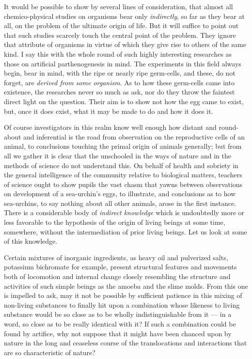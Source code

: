 \documentclass[a4paper, 11pt, oneside, polutonikogreek, english]{article}
\begin{document}
It would be possible to show by several lines of consideration, that almost all chemico-physical studies on organisms bear only \emph{indirectly}, so far as they bear at all, on the problem of the ultimate origin of life. But it will suffice to point out that such studies scarcely touch the central point of the problem. They ignore that attribute of organisms in virtue of which they give rise to others of the same kind. I say this with the whole round of such highly interesting researches as those on artificial parthenogenesis in mind. The experiments in this field always begin, bear in mind, with the ripe or nearly ripe germ-cells, and these, do not forget, are \emph{derived from some organism}. As to how these germ-cells came into existence, the researches never so much as ask, nor do they throw the faintest direct light on the question. Their aim is to show not how the egg came to exist, but, once it does exist, what it may be made to do and how it does it.

Of course investigators in this realm know well enough how distant and round-about and inferential is the road from observation on the reproductive cells of an animal, to conclusions touching the primal origin of animals generally; but from all we gather it is clear that the unschooled in the ways of nature and in the methods of science do not understand this. On behalf of health and sobriety in the general intelligence of the community relative to biological matters, teachers of science ought to show pupils the vast chasm that yawns between observations on development of a sea-urchin's eggs, to illustrate, and conclusions as to how sea-urchins, to say nothing about all other animals, arose in the first instance. There is a considerable body of \emph{indirect knowledge} which is undoubtedly more or less favorable to the hypothesis of the origin of living beings at some time, somewhere, without the intermediation of prior living beings. Let us look at some of this knowledge.

Certain mixtures of inorganic ingredients, as heavy oil and pulverized salts, potassium bichromate for example, present structural features and movements both of locomotion and internal change closely resembling the structure and activities of such simple beings as the amoeba and the slime molds. From this one is impelled to ask, may it not be possible by sufficient patience in this mixing of non-living substances to finally hit upon a combination whose likeness to living substance would be so close as to be wholly indistinguishable from it --- in a word, so close as to be really identical with it? If such a combination could be found by artifice, why not suppose that it might have been chanced upon by nature in the long and ceaseless course of the translocations and interactions that are so characteristic of nature?
\end{document}
